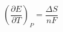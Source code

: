 \documentclass[preview]{standalone}
\begin{document}
\[\left(\frac{\partial E}{\partial T}\right)_P = \frac{\Delta S}{nF} \tag{1.17}\]
\end{document}

